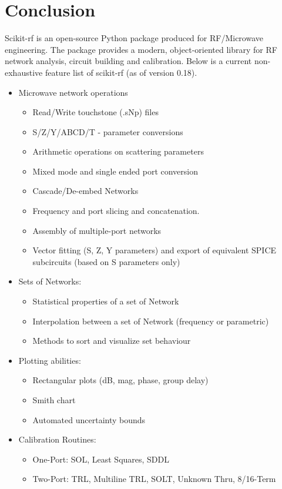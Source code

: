 \documentclass[journal, onecolumn]{IEEEtran}
\begin{document}
\section{Conclusion}
Scikit-rf is an open-source Python package produced for RF/Microwave engineering. The package provides a modern, object-oriented library for RF network analysis, circuit building and calibration. Below is a current non-exhaustive feature list of scikit-rf (as of version 0.18).

\begin{itemize}
	\item	Microwave network operations
	\begin{itemize}
	\item	Read/Write touchstone (.sNp) files
	\item	S/Z/Y/ABCD/T - parameter conversions
	\item	Arithmetic operations on scattering parameters
	\item   Mixed mode and single ended port conversion
	\item	Cascade/De-embed Networks
	\item	Frequency and port slicing and concatenation.
	\item   Assembly of multiple-port networks
	\item    Vector fitting (S, Z, Y parameters) and export of equivalent SPICE subcircuits (based on S parameters only)
	\end{itemize}
\item	Sets of Networks:
	\begin{itemize}
		\item Statistical properties of a set of Network
		\item Interpolation between a set of Network (frequency or parametric)
		\item Methods to sort and visualize set behaviour
	\end{itemize}
\item	Plotting abilities:
	\begin{itemize}
		\item Rectangular plots (dB, mag, phase, group delay)
		\item Smith chart
		\item Automated uncertainty bounds
	\end{itemize}
\item	Calibration Routines:
	\begin{itemize}
		\item One-Port: SOL, Least Squares, SDDL
		\item Two-Port: TRL, Multiline TRL, SOLT, Unknown Thru, 8/16-Term

\end{itemize}
\end{itemize}
\end{document}
